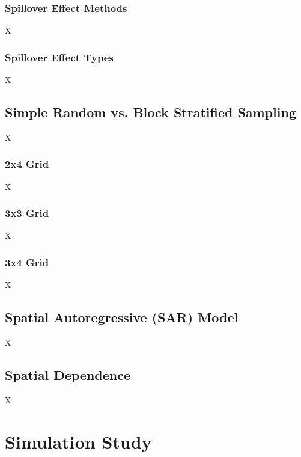\documentclass{article}[11pt]
\begin{document}
\subsubsection{Spillover Effect Methods}\label{Section:SpilloverEffectMethods}

X

\subsubsection{Spillover Effect Types}\label{section:SpilloverEffectTypes}

X

\subsection{Simple Random vs. Block Stratified Sampling}

X

\subsubsection{2x4 Grid}

X

\subsubsection{3x3 Grid}

X

\subsubsection{3x4 Grid}

X

\subsection{Spatial Autoregressive (SAR) Model}\label{section:SAR}

X

\subsection{Spatial Dependence}\label{section:SpatialWeightsMatrix}

X

\section{Simulation Study}
\end{document}
